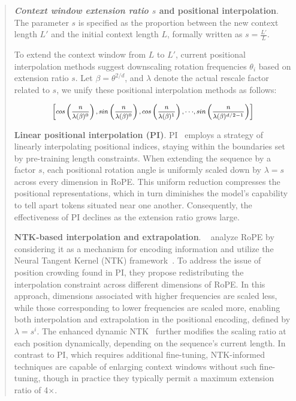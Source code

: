 \begin{abstract}
\textbf{\emph{Context window extension ratio $s$} and positional interpolation}. The parameter $s$ is specified as the proportion between the new context length $L'$ and the initial context length $L$, formally written as $s=\frac{L'}{L}$.

To extend the context window from $L$ to $L'$, current positional interpolation methods suggest downscaling rotation frequencies $\theta_i$ based on extension ratio $s$. Let $\beta=\theta^{2/d}$, and $\lambda$ denote the actual rescale factor related to $s$, we   unify these positional interpolation methods as follows:

\begin{equation}	
	\fontsize{7.5}{7.5} \selectfont
	\label{eq:unified_rope}
	\begin{aligned}
		\left[cos\left(\frac{n}{\lambda(\beta)^0}\right), sin \left(\frac{n}{\lambda(\beta)^0}\right), cos\left(\frac{n}{\lambda(\beta)^1}\right), \cdot\cdot\cdot,  sin \left(\frac{n}{\lambda(\beta)^{d/2-1}}\right) \right]   
	\end{aligned}
\end{equation}

\textbf{Linear positional interpolation (PI)}. PI~\cite{pi} employs a strategy of linearly interpolating positional indices, staying within the boundaries set by pre-training length constraints. When extending the sequence by a factor $s$, each positional rotation angle is uniformly scaled down by $\lambda=s$ across every dimension in RoPE. This uniform reduction compresses the positional representations, which in turn diminishes the model's capability to tell apart tokens situated near one another. Consequently, the effectiveness of PI declines as the extension ratio grows large.

\textbf{NTK-based interpolation and extrapolation}. ~\cite{ntk,dynamicntk} analyze RoPE by considering it as a mechanism for encoding information and utilize the Neural Tangent Kernel (NTK) framework~\cite{jacot2018neural,tancik2020fourier}. To address the issue of position crowding found in PI, they propose redistributing the interpolation constraint across different dimensions of RoPE. In this approach, dimensions associated with higher frequencies are scaled less, while those corresponding to lower frequencies are scaled more, enabling both interpolation and extrapolation in the positional encoding, defined by $\lambda=s^{i}$. The enhanced dynamic NTK~\cite{dynamicntk} further modifies the scaling ratio at each position dynamically, depending on the sequence's current length. In contrast to PI, which requires additional fine-tuning, NTK-informed techniques are capable of enlarging context windows without such fine-tuning, though in practice they typically permit a maximum extension ratio of 4$\times$.


\end{abstract}
